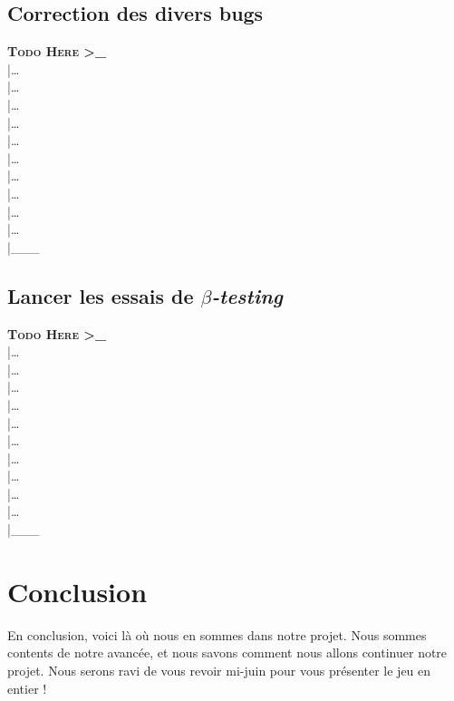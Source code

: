 \documentclass[12pt,a4paper]{article}
\begin{document}
        \subsection{Correction des divers bugs}
            \textbf{\textsc{Todo Here >\_}}\\
            |\dots\\|\dots\\|\dots\\|\dots\\|\dots\\|\dots\\|\dots\\|\dots\\|\dots\\|\dots\\|\_\_\_\\
        \subsection{Lancer les essais de \(\beta\)\textsl{-testing}}
            \textbf{\textsc{Todo Here >\_}}\\
            |\dots\\|\dots\\|\dots\\|\dots\\|\dots\\|\dots\\|\dots\\|\dots\\|\dots\\|\dots\\|\_\_\_\\


    \section*{Conclusion}
        En conclusion, voici là où nous en sommes dans notre projet.
        Nous sommes contents de notre avancée, et nous savons comment
        nous allons continuer notre projet. 
        Nous serons ravi de vous revoir mi-juin pour vous présenter le jeu en entier !
\end{document}
